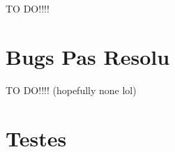 \documentclass[a4paper]{article} %
\begin{document}
TO DO!!!!


\section{Bugs Pas Resolu}
\label{sec:bug}

TO DO!!!! (hopefully none lol)


\section{Testes}
\label{sec:test}
\end{document}
